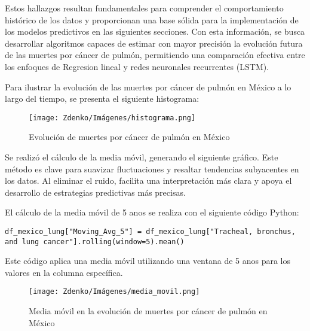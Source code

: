 Estos hallazgos resultan fundamentales para comprender el comportamiento histórico de los datos y proporcionan una base sólida para la implementación de los modelos predictivos en las siguientes secciones. Con esta información, se busca desarrollar algoritmos capaces de estimar con mayor precisión la evolución futura de las muertes por cáncer de pulmón, permitiendo una comparación efectiva entre los enfoques de Regresion lineal y redes neuronales recurrentes (LSTM).

Para ilustrar la evolución de las muertes por cáncer de pulmón en México a lo largo del tiempo, se presenta el siguiente histograma:

\begin{figure}[ht] \centering \texttt{[image: Zdenko/Imágenes/histograma.png]} \caption{Evolución de muertes por cáncer de pulmón en México} \label{fig:histograma_pulmon} \end{figure}

Se realizó el cálculo de la media móvil, generando el siguiente gráfico. Este método es clave para suavizar fluctuaciones y resaltar tendencias subyacentes en los datos. Al eliminar el ruido, facilita una interpretación más clara y apoya el desarrollo de estrategias predictivas más precisas.


El cálculo de la media móvil de 5 anos se realiza con el siguiente código Python:

\begin{lstlisting}
df_mexico_lung["Moving_Avg_5"] = df_mexico_lung["Tracheal, bronchus, and lung cancer"].rolling(window=5).mean()
\end{lstlisting}

Este código aplica una media móvil utilizando una ventana de 5 anos para los valores en la columna específica.

\begin{figure}[h] \centering \texttt{[image: Zdenko/Imágenes/media\_movil.png]} \caption{Media móvil en la evolución de muertes por cáncer de pulmón en México} \label{fig:media_movil} \end{figure}

